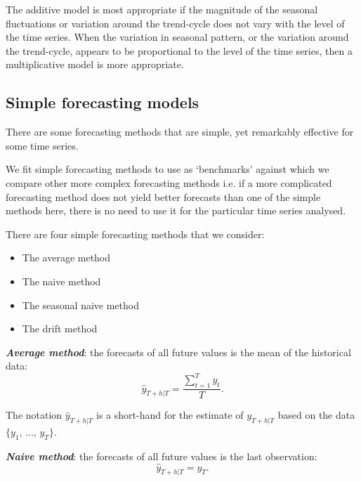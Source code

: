       The additive model is most appropriate if the magnitude of the seasonal fluctuations or variation around the trend-cycle does not vary with the level of the time series. When the variation in seasonal pattern, or the variation around the trend-cycle, appears to be proportional to the level of the time series, then a multiplicative model is more appropriate. 

   \subsection{Simple forecasting models}

      \cite{Watson2025} There are some forecasting methods that are simple, yet remarkably effective for some time series.

      \vspace{1em}
      
      We fit simple forecasting methods to use as `benchmarks' against which we compare other more complex forecasting methods i.e. if a more complicated forecasting method does not yield better forecasts than one of the simple methods here, there is no need to use it for the particular time series analysed.

      \vspace{1em}

      There are four simple forecasting methods that we consider:
      \begin{itemize}
         \item The average method
         \item The naive method
         \item The seasonal naive method
         \item The drift method
      \end{itemize}

      \vspace{1em}

      \textbf{\textit{Average method}}: the forecasts of all future values is the mean of the historical data: \[\hat{y}_{T+h|T} = \frac{\sum_{t=1}^{T} y_{t}}{T}.\]

      The notation \(\hat{y}_{T+h|T}\) is a short-hand for the estimate of \(y_{T+h|T}\) based on the data \(\{y_{1},\, \ldots,\, y_{T}\}\).

      \vspace{1em}

      \textbf{\textit{Naive method}}: the forecasts of all future values is the last observation: \[\hat{y}_{T+h|T} = y_{T}.\]

